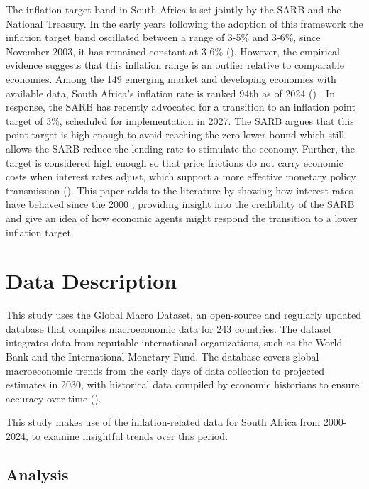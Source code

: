 \documentclass[11pt,preprint]{elsarticle}
\numberwithin{equation}{section}
\numberwithin{figure}{section}
\numberwithin{table}{section}
\begin{document}
The inflation target band in South Africa is set jointly by the SARB and
the National Treasury. In the early years following the adoption of this
framework the inflation target band oscillated between a range of 3-5\%
and 3-6\%, since November 2003, it has remained constant at 3-6\%
(). However, the
empirical evidence suggests that this inflation range is an outlier
relative to comparable economies. Among the 149 emerging market and
developing economies with available data, South Africa's inflation rate
is ranked 94th as of 2024 () . In response, the SARB has recently advocated for a
transition to an inflation point target of 3\%, scheduled for
implementation in 2027. The SARB argues that this point target is high
enough to avoid reaching the zero lower bound which still allows the
SARB reduce the lending rate to stimulate the economy. Further, the
target is considered high enough so that price frictions do not carry
economic costs when interest rates adjust, which support a more
effective monetary policy transmission
(). This paper
adds to the literature by showing how interest rates have behaved since
the 2000 , providing insight into the credibility of the SARB and give
an idea of how economic agents might respond the transition to a lower
inflation target.

\section{\texorpdfstring{Data
Description\label{Data Description}}{Data Description}}\label{data-description}

This study uses the Global Macro Dataset, an open-source and regularly
updated database that compiles macroeconomic data for 243 countries. The
dataset integrates data from reputable international organizations, such
as the World Bank and the International Monetary Fund. The database
covers global macroeconomic trends from the early days of data
collection to projected estimates in 2030, with historical data compiled
by economic historians to ensure accuracy over time
().

This study makes use of the inflation-related data for South Africa from
2000-2024, to examine insightful trends over this period.

\subsection{Analysis}\label{analysis}
\end{document}
